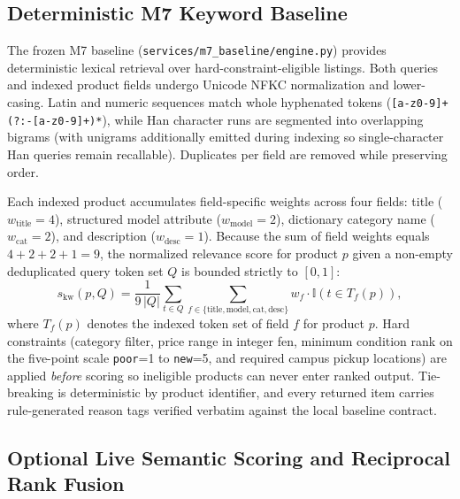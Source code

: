 \subsection{Deterministic M7 Keyword Baseline}

The frozen M7 baseline (\texttt{services/m7\_baseline/engine.py}) provides deterministic lexical retrieval over hard-constraint-eligible listings. Both queries and indexed product fields undergo Unicode NFKC normalization and lower-casing. Latin and numeric sequences match whole hyphenated tokens (\texttt{[a-z0-9]+(?:-[a-z0-9]+)*}), while Han character runs are segmented into overlapping bigrams (with unigrams additionally emitted during indexing so single-character Han queries remain recallable). Duplicates per field are removed while preserving order.

Each indexed product accumulates field-specific weights across four fields: title ($w_{\text{title}} = 4$), structured model attribute ($w_{\text{model}} = 2$), dictionary category name ($w_{\text{cat}} = 2$), and description ($w_{\text{desc}} = 1$). Because the sum of field weights equals $4 + 2 + 2 + 1 = 9$, the normalized relevance score for product $p$ given a non-empty deduplicated query token set $Q$ is bounded strictly to $[0, 1]$:
\begin{equation}
  s_{\text{kw}}(p, Q) = \frac{1}{9\,|Q|} \sum_{t \in Q} \sum_{f \in \{\text{title}, \text{model}, \text{cat}, \text{desc}\}} w_f \cdot \mathbb{I}\!\left(t \in T_f(p)\right),
  \label{eq:m7-score}
\end{equation}
where $T_f(p)$ denotes the indexed token set of field $f$ for product $p$. Hard constraints (category filter, price range in integer fen, minimum condition rank on the five-point scale \texttt{poor}=1 to \texttt{new}=5, and required campus pickup locations) are applied \emph{before} scoring so ineligible products can never enter ranked output. Tie-breaking is deterministic by product identifier, and every returned item carries rule-generated reason tags verified verbatim against the local baseline contract.

\subsection{Optional Live Semantic Scoring and Reciprocal Rank Fusion}

